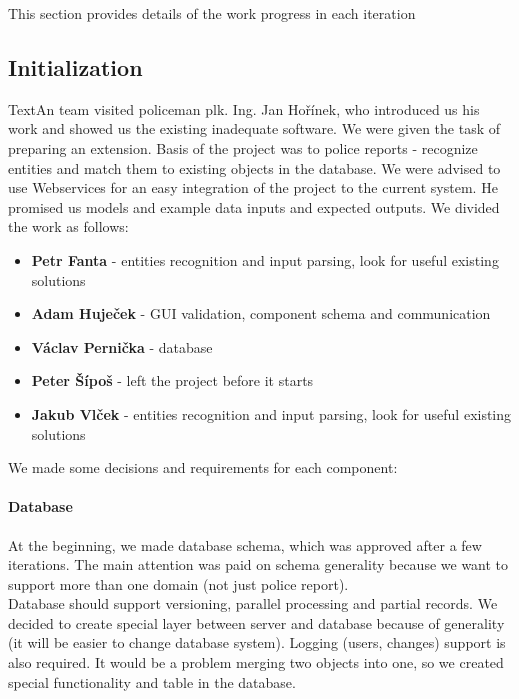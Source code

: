 This section provides details of the work progress in each iteration

\subsection{Initialization}
TextAn team visited policeman plk. Ing. Jan Hořínek, who introduced us his work and showed
us the existing inadequate software. We were given the task of preparing an extension. Basis of the
project was to police reports - recognize entities and match them
to existing objects in the database. We were advised to use Webservices for an easy integration of 
the project to the current system. He promised us models and
example data inputs and expected outputs. We divided the work as follows:

\begin{itemize}
\item \textbf{Petr Fanta} - entities recognition and input parsing, look for useful existing solutions
\item \textbf{Adam Huječek} - GUI validation, component schema and communication
\item \textbf{Václav Pernička} - database
\item \textbf{Peter Šípoš} - left the project before it starts
\item \textbf{Jakub Vlček} - entities recognition and input parsing, look for useful existing solutions
\end{itemize}


We made some decisions and requirements for each component:

\paragraph{Database}
At the beginning, we made database schema, which was approved after a few
iterations. The main attention was paid on schema generality because we want to
support more than one domain (not just police report).\\
Database should support versioning, parallel processing and partial records. We
decided to create special layer between server and database because of
generality (it will be easier to change database system). Logging (users,
changes) support is also required. It would be a problem merging two objects into 
one, so we created special functionality and table in the
database.

